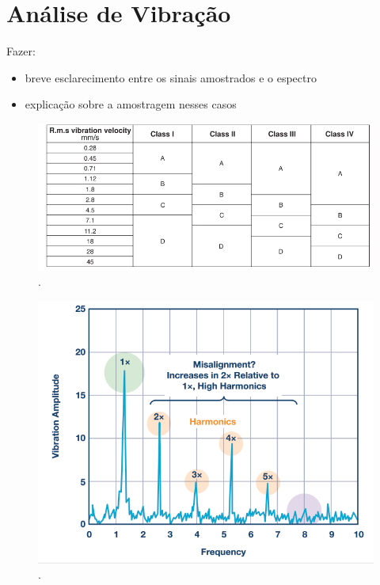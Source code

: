 % 

\section{Análise de Vibração}\label{sec:}

Fazer:
\begin{itemize}
    \item breve esclarecimento entre os sinais amostrados e o espectro
    \item explicação sobre a amostragem nesses casos
\end{itemize}

\begin{figure}[H]
    \caption{.}
    \begin{center}
        \includegraphics[scale=.5]{referencial/img/iso10816-1_randall_p146.png}
    \end{center}
    \label{fig:}
\end{figure}

\begin{figure}[H]
    \caption{.}
    \begin{center}
        \includegraphics[scale=.4]{referencial/img/misa_analog_p2.png}
    \end{center}
    \label{fig:}
\end{figure}

